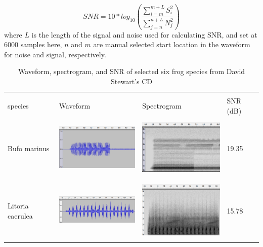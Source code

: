 \begin{equation}
SNR=10*log_{10}(\frac{\sum_{i=m}^{m+L}S_{i}^2}{\sum_{j=n}^{n+L}N_{j}^2})
\end{equation}
where $L$ is the length of the signal and noise used for calculating SNR, and set at 6000 samples here, $n$ and $m$ are manual selected start location in the waveform for noise and signal, respectively. 



\begin{table}[htb!]
\centering
\caption[Waveform, spectrogram, and SNR of CD]{Waveform, spectrogram, and SNR of selected six frog species from David Stewart's CD}
\label{tab:wav_spec_cd}
\begin{tabular}{llll}
\hline\hline
\backslashbox{Frog \\ species}{}        & Waveform & Spectrogram & SNR (dB)   \\ \hline
Bufo marinus        &   
\begin{minipage}{.3\textwidth} \includegraphics[width=45mm, height=30mm]{image/Ch1/toad_wave.png}  \end{minipage}    &   \begin{minipage}{.3\textwidth} \includegraphics[width=45mm, height=30mm]{image/Ch1/toad_spec.png}  \end{minipage}          & 19.35 \\ \hline
Litoria caerulea    &  \begin{minipage}{.3\textwidth} \includegraphics[width=45mm, height=30mm]{image/Ch1/caerulea_wav.png}  \end{minipage}      &     \begin{minipage}{.3\textwidth} \includegraphics[width=45mm, height=30mm]{image/Ch1/caerulea_spec.png}   \end{minipage}     & 15.78 \\ \hline

\end{tabular}
\end{table}
